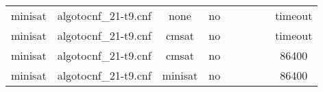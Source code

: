\begin{appendices}
\begin{table}[p]
\begin{center}
\begin{tabular}{l|cccccccc}
  minisat                        & algotocnf\_21-t9.cnf           & none       & no    &            &           &           &            & timeout \\ %
  minisat                        & algotocnf\_21-t9.cnf           & cmsat      & no    &            &           &           &            & timeout \\ %
  minisat                        & algotocnf\_21-t9.cnf           & cmsat      & no    &            &           &           &            & 86400 \\ %
  minisat                        & algotocnf\_21-t9.cnf           & minisat    & no    &            &           &           &            & 86400 \\ %
    \end{tabular}
  \end{center}
\end{table}

\newpage


\end{appendices}
